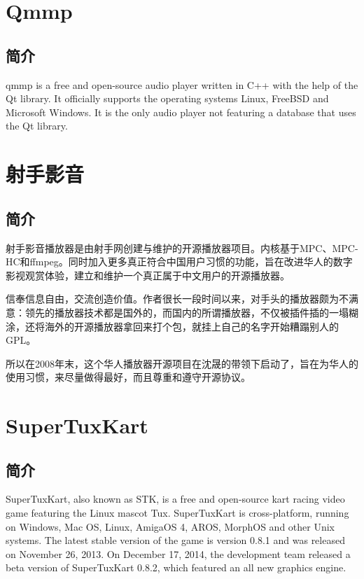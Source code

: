 \documentclass[paper=a4,fontsize=11pt]{article}
\begin{document}
	\section{Qmmp}
	
	\subsection{简介}
	qmmp is a free and open-source audio player written in C++ with the help of the Qt library. It officially supports the operating systems Linux, FreeBSD and Microsoft Windows. It is the only audio player not featuring a database that uses the Qt library.
	
	\section{射手影音}
	
	\subsection{简介}
	射手影音播放器是由射手网创建与维护的开源播放器项目。内核基于MPC、MPC-HC和ffmpeg。同时加入更多真正符合中国用户习惯的功能，旨在改进华人的数字影视观赏体验，建立和维护一个真正属于中文用户的开源播放器。
	
	信奉信息自由，交流创造价值。作者很长一段时间以来，对手头的播放器颇为不满意：领先的播放器技术都是国外的，而国内的所谓播放器，不仅被插件插的一塌糊涂，还将海外的开源播放器拿回来打个包，就挂上自己的名字开始糟蹋别人的GPL。
	
	所以在2008年末，这个华人播放器开源项目在沈晟的带领下启动了，旨在为华人的使用习惯，来尽量做得最好，而且尊重和遵守开源协议。
			
	\section{SuperTuxKart}
	
	\subsection{简介}
	
	SuperTuxKart, also known as STK, is a free and open-source kart racing video game featuring the Linux mascot Tux. SuperTuxKart is cross-platform, running on Windows, Mac OS, Linux, AmigaOS 4, AROS, MorphOS and other Unix systems. The latest stable version of the game is version 0.8.1 and was released on November 26, 2013. On December 17, 2014, the development team released a beta version of SuperTuxKart 0.8.2, which featured an all new graphics engine.
	
\end{document}
